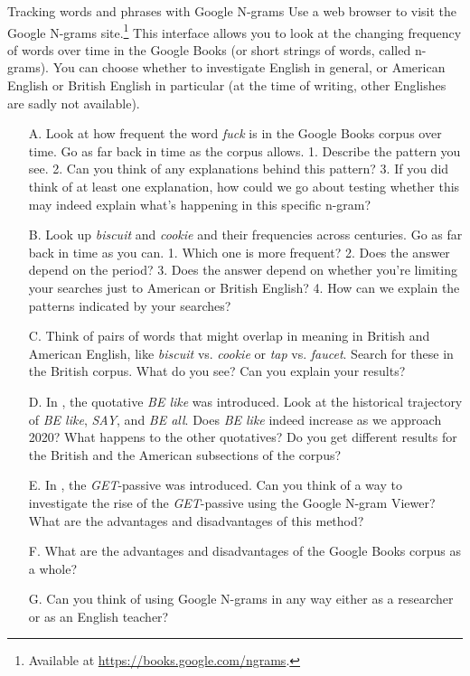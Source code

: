 \begin{exercises}{Tracking words and phrases with Google N-grams}\label{exercise-ngrams}
Use a web browser to visit the Google N-grams site.\footnote{Available at \url{https://books.google.com/ngrams}.} This interface allows you to look at the changing frequency of words over time in the Google Books  (or short strings of words, called n-grams). You can choose whether to investigate English in general, or American English or British English in particular (at the time of writing, other Englishes are sadly not available).

\begin{itemize}
    \item [A.] Look at how frequent the word \textit{fuck} is in the Google Books corpus over time. Go as far back in time as the corpus allows. 1. Describe the pattern you see. 2. Can you think of any explanations behind this pattern? 3. If you did think of at least one explanation, how could we go about testing whether this may indeed explain what's happening in this specific n-gram?
    \item [B.] Look up \textit{biscuit} and \textit{cookie} and their frequencies across centuries. Go as far back in time as you can. 1. Which one is more frequent? 2. Does the answer depend on the period? 3. Does the answer depend on whether you're limiting your searches just to American or British English? 4. How can we explain the patterns indicated by your searches?
    \item [C.] Think of pairs of words that might overlap in meaning in British and American English, like \textit{biscuit} vs. \textit{cookie} or \textit{tap} vs. \textit{faucet}. Search for these in the British corpus. What do you see? Can you explain your results?
    \item[D.] In , the quotative \textit{BE like} was introduced. Look at the historical trajectory of \textit{BE like}, \textit{SAY}, and \textit{BE all}. Does \textit{BE like} indeed increase as we approach 2020? What happens to the other quotatives? Do you get different results for the British and the American subsections of the corpus?
    \item[E.] In , the \emph{GET}-passive was introduced. Can you think of a way to investigate the rise of the \emph{GET}-passive using the Google N-gram Viewer? What are the advantages and disadvantages of this method?
    \item[F.] What are the advantages and disadvantages of the Google Books corpus as a whole?
    \item[G.] Can you think of using Google N-grams in any way either as a researcher or as an English teacher?
\end{itemize}
\end{exercises}

